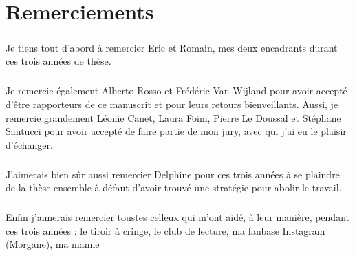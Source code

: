 \thispagestyle{empty}

\section*{Remerciements}

\subparagraph{}Je tiens tout d'abord à remercier Eric et Romain, mes deux encadrants durant ces trois années de thèse.

\subparagraph{}Je remercie également Alberto Rosso et Frédéric Van Wijland pour avoir accepté d'être rapporteurs de ce manuscrit et pour leurs retours bienveillants. Aussi, je remercie grandement Léonie Canet, Laura Foini, Pierre Le Doussal et Stéphane Santucci pour avoir accepté de faire partie de mon jury, avec qui j'ai eu le plaisir d'échanger.

\subparagraph{}J'aimerais bien sûr aussi remercier Delphine pour ces trois années à se plaindre de la thèse ensemble à défaut d'avoir trouvé une stratégie pour abolir le travail. 

\subparagraph{}Enfin j'aimerais remercier toustes celleux qui m'ont aidé, à leur manière, pendant ces trois années : le tiroir à cringe, le club de lecture, ma fanbase Instagram (Morgane), ma mamie 

\thispagestyle{empty}